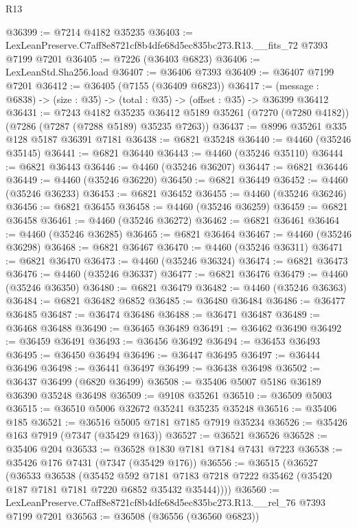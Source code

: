 \begin{lexlean}{R13}
\begin{coremodule}
@36399 := @7214 @4182 @35235
@36403 := LexLeanPreserve.C7aff8e8721cf8b4dfe68d5ec835bc273.R13.__fits_72 @7393 @7199 @7201
@36405 := @7226 (@36403 @6823)
@36406 := LexLeanStd.Sha256.load
@36407 := @36406 @7393
@36409 := @36407 @7199 @7201
@36412 := @36405 (@7155 (@36409 @6823))
@36417 := (message : @6838) -> (size : @35) -> (total : @35) -> (offset : @35) -> @36399 @36412
@36431 := @7243
    @4182
    @35235
    @36412
    @5189
    @35261
    (@7270 (@7280 @4182))
    (@7286 (@7287 (@7288 @5189) @35235 @7263))
@36437 := @8996 @35261 @335 @128 @5187 @36391 @7181
@36438 := @6821 @35248
@36440 := @4460 (@35246 @35145)
@36441 := @6821 @36440
@36443 := @4460 (@35246 @35110)
@36444 := @6821 @36443
@36446 := @4460 (@35246 @36207)
@36447 := @6821 @36446
@36449 := @4460 (@35246 @36220)
@36450 := @6821 @36449
@36452 := @4460 (@35246 @36233)
@36453 := @6821 @36452
@36455 := @4460 (@35246 @36246)
@36456 := @6821 @36455
@36458 := @4460 (@35246 @36259)
@36459 := @6821 @36458
@36461 := @4460 (@35246 @36272)
@36462 := @6821 @36461
@36464 := @4460 (@35246 @36285)
@36465 := @6821 @36464
@36467 := @4460 (@35246 @36298)
@36468 := @6821 @36467
@36470 := @4460 (@35246 @36311)
@36471 := @6821 @36470
@36473 := @4460 (@35246 @36324)
@36474 := @6821 @36473
@36476 := @4460 (@35246 @36337)
@36477 := @6821 @36476
@36479 := @4460 (@35246 @36350)
@36480 := @6821 @36479
@36482 := @4460 (@35246 @36363)
@36484 := @6821 @36482 @6852
@36485 := @36480 @36484
@36486 := @36477 @36485
@36487 := @36474 @36486
@36488 := @36471 @36487
@36489 := @36468 @36488
@36490 := @36465 @36489
@36491 := @36462 @36490
@36492 := @36459 @36491
@36493 := @36456 @36492
@36494 := @36453 @36493
@36495 := @36450 @36494
@36496 := @36447 @36495
@36497 := @36444 @36496
@36498 := @36441 @36497
@36499 := @36438 @36498
@36502 := @36437 @36499 (@6820 @36499)
@36508 := @35406 @5007 @5186 @36189 @36390 @35248 @36498
@36509 := @9108 @35261
@36510 := @36509 @5003
@36515 := @36510 @5006 @32672 @35241 @35235 @35248
@36516 := @35406 @185
@36521 := @36516 @5005 @7181 @7185 @7919 @35234
@36526 := @35426 @163 @7919 (@7347 (@35429 @163))
@36527 := @36521 @36526
@36528 := @35406 @204
@36533 := @36528 @1830 @7181 @7184 @7431 @7223
@36538 := @35426 @176 @7431 (@7347 (@35429 @176))
@36556 := @36515
    (@36527
      (@36533
        @36538
        (@35452
          @592
          @7181
          @7183
          @7218
          @7222
          @35462
          (@35420 @187 @7181 @7181 @7220 @6852 @35432 @35444))))
@36560 := LexLeanPreserve.C7aff8e8721cf8b4dfe68d5ec835bc273.R13.__rel_76 @7393 @7199 @7201
@36563 := @36508 (@36556 (@36560 @6823))

\end{coremodule}
\end{lexlean}
